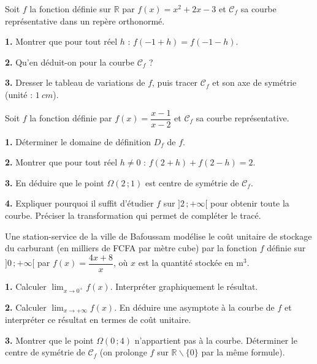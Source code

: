\documentclass[11pt]{article}
\newcounter{popsec}
\newcounter{popsub}
\newcommand{\courssub}[1]{%
  \stepcounter{popsub}%
  \par\vspace{9pt}\noindent{\popxbold\fontsize{11.5}{13}\selectfont\color{popink}{\color{poporange}\thepopsec.\thepopsub}\hspace{6pt}#1}\par\nopagebreak\vspace{4pt}
}
\def\setminus{\mathbin{\backslash}}\let\smallsetminus\setminus
\begin{document}
\courssub{Je m'entraîne}

\begin{exercice}
Soit $f$ la fonction définie sur $\mathbb{R}$ par $f(x)=x^2+2x-3$ et $\mathcal{C}_f$ sa courbe représentative dans un repère orthonormé.

\textbf{1.} Montrer que pour tout réel $h$ : $f(-1+h)=f(-1-h)$.

\textbf{2.} Qu'en déduit-on pour la courbe $\mathcal{C}_f$ ?

\textbf{3.} Dresser le tableau de variations de $f$, puis tracer $\mathcal{C}_f$ et son axe de symétrie (unité : $\SI{1}{cm}$).
\end{exercice}

\begin{exercice}
Soit $f$ la fonction définie par $f(x)=\dfrac{x-1}{x-2}$ et $\mathcal{C}_f$ sa courbe représentative.

\textbf{1.} Déterminer le domaine de définition $D_f$ de $f$.

\textbf{2.} Montrer que pour tout réel $h\neq 0$ : $f(2+h)+f(2-h)=2$.

\textbf{3.} En déduire que le point $\Omega(2\,;1)$ est centre de symétrie de $\mathcal{C}_f$.

\textbf{4.} Expliquer pourquoi il suffit d'étudier $f$ sur $]2\,;+\infty[$ pour obtenir toute la courbe. Préciser la transformation qui permet de compléter le tracé.
\end{exercice}

\begin{exercice}
Une station-service de la ville de Bafoussam modélise le coût unitaire de stockage du carburant (en milliers de FCFA par mètre cube) par la fonction $f$ définie sur $]0\,;+\infty[$ par $f(x)=\dfrac{4x+8}{x}$, où $x$ est la quantité stockée en $\mathrm{m}^3$.

\textbf{1.} Calculer $\displaystyle\lim_{x\to 0^+}f(x)$. Interpréter graphiquement le résultat.

\textbf{2.} Calculer $\displaystyle\lim_{x\to +\infty}f(x)$. En déduire une asymptote à la courbe de $f$ et interpréter ce résultat en termes de coût unitaire.

\textbf{3.} Montrer que le point $\Omega(0\,;4)$ n'appartient pas à la courbe. Déterminer le centre de symétrie de $\mathcal{C}_f$ (on prolonge $f$ sur $\mathbb{R}\setminus\{0\}$ par la même formule).
\end{exercice}
\end{document}
